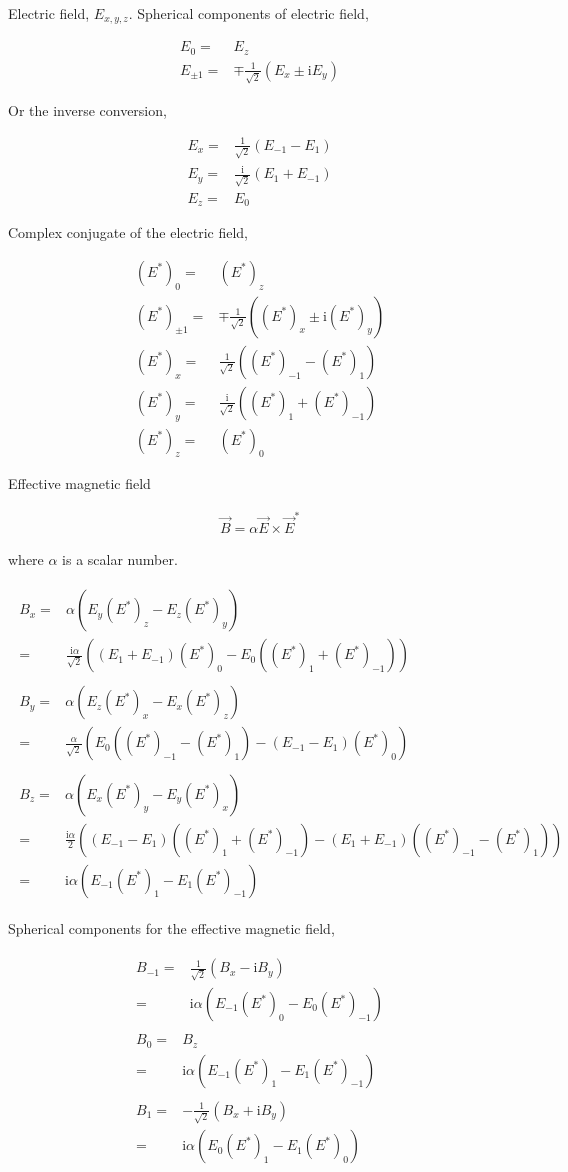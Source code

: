 \documentclass[10pt,fleqn]{article}
\newcommand{\ui}{\mathrm{i}}
\newcommand{\eqar}[1]
{
  \begin{align}
    #1
  \end{align}
}
\newcommand{\paren}[1]{{\left({#1}\right)}}
\begin{document}
Electric field, $E_{x,y,z}$. Spherical components of electric field,
\eqar{
  E_0=&E_z\\
  E_{\pm1}=&\mp\frac{1}{\sqrt2}\paren{E_x\pm\ui E_y}
}
Or the inverse conversion,
\eqar{
  E_x=&\frac{1}{\sqrt2}\paren{E_{-1}-E_{1}}\\
  E_y=&\frac{\ui}{\sqrt2}\paren{E_{1}+E_{-1}}\\
  E_z=&E_0
}
Complex conjugate of the electric field,
\eqar{
  (E^*)_0=&(E^*)_z\\
  (E^*)_{\pm1}=&\mp\frac{1}{\sqrt2}\paren{(E^*)_x\pm\ui (E^*)_y}\\
  (E^*)_x=&\frac{1}{\sqrt2}\paren{(E^*)_{-1}-(E^*)_{1}}\\
  (E^*)_y=&\frac{\ui}{\sqrt2}\paren{(E^*)_{1}+(E^*)_{-1}}\\
  (E^*)_z=&(E^*)_0
}
Effective magnetic field
\eqar{
  \vec B=\alpha\vec E\times\vec E^*
}
where $\alpha$ is a scalar number.
\eqar{
  \begin{split}
    B_x=&\alpha\paren{E_y(E^*)_z-E_z(E^*)_y}\\
    =&\frac{\ui\alpha}{\sqrt2}\paren{\paren{E_{1}+E_{-1}}(E^*)_0-E_0\paren{(E^*)_{1}+(E^*)_{-1}}}
  \end{split}\\
  \begin{split}
    B_y=&\alpha\paren{E_z(E^*)_x-E_x(E^*)_z}\\
    =&\frac{\alpha}{\sqrt2}\paren{E_0\paren{(E^*)_{-1}-(E^*)_{1}}-\paren{E_{-1}-E_{1}}(E^*)_0}
  \end{split}\\
  \begin{split}
    B_z=&\alpha\paren{E_x(E^*)_y-E_y(E^*)_x}\\
    =&\frac{\ui\alpha}{2}\paren{\paren{E_{-1}-E_{1}}\paren{(E^*)_{1}+(E^*)_{-1}}-\paren{E_{1}+E_{-1}}\paren{(E^*)_{-1}-(E^*)_{1}}}\\
    =&\ui\alpha\paren{E_{-1}(E^*)_{1}-E_{1}(E^*)_{-1}}
  \end{split}
}
Spherical components for the effective magnetic field,
\eqar{
  \begin{split}
    B_{-1}=&\frac{1}{\sqrt2}\paren{B_x-\ui B_y}\\
    =&\ui\alpha\paren{E_{-1}(E^*)_0-E_0(E^*)_{-1}}
  \end{split}\\
  \begin{split}
    B_0=&B_z\\
    =&\ui\alpha\paren{E_{-1}(E^*)_{1}-E_{1}(E^*)_{-1}}
  \end{split}\\
  \begin{split}
    B_1=&-\frac{1}{\sqrt2}\paren{B_x+\ui B_y}\\
    =&\ui\alpha\paren{E_0(E^*)_{1}-E_{1}(E^*)_0}
  \end{split}
}
\end{document}
